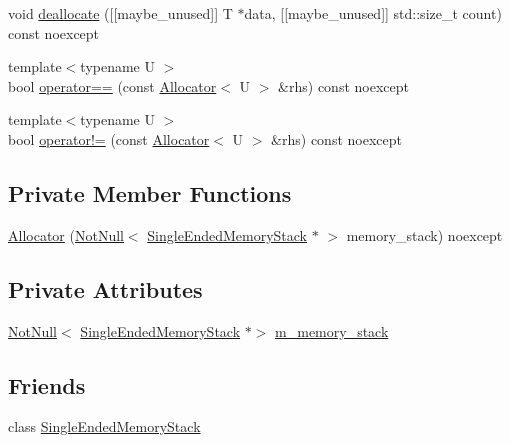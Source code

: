 \begin{DoxyCompactItemize}
void \mbox{\hyperlink{classmage_1_1_single_ended_memory_stack_1_1_allocator_ab0b13d5093410debc207d9aa7066b67c}{deallocate}} (\mbox{[}\mbox{[}maybe\+\_\+unused\mbox{]}\mbox{]} T $\ast$data, \mbox{[}\mbox{[}maybe\+\_\+unused\mbox{]}\mbox{]} std\+::size\+\_\+t count) const noexcept
\item 
{\footnotesize template$<$typename U $>$ }\\bool \mbox{\hyperlink{classmage_1_1_single_ended_memory_stack_1_1_allocator_ac59d13195925c0b0bf536edd501708b8}{operator==}} (const \mbox{\hyperlink{classmage_1_1_single_ended_memory_stack_1_1_allocator}{Allocator}}$<$ U $>$ \&rhs) const noexcept
\item 
{\footnotesize template$<$typename U $>$ }\\bool \mbox{\hyperlink{classmage_1_1_single_ended_memory_stack_1_1_allocator_a57c563e2632a28328df5588559047df6}{operator!=}} (const \mbox{\hyperlink{classmage_1_1_single_ended_memory_stack_1_1_allocator}{Allocator}}$<$ U $>$ \&rhs) const noexcept
\end{DoxyCompactItemize}
\subsection*{Private Member Functions}
\begin{DoxyCompactItemize}
\item 
\mbox{\hyperlink{classmage_1_1_single_ended_memory_stack_1_1_allocator_a8c82486b5fa67f596738805aa73559d9}{Allocator}} (\mbox{\hyperlink{namespacemage_a8769f9d670d6b585ea306cb1062af94b}{Not\+Null}}$<$ \mbox{\hyperlink{classmage_1_1_single_ended_memory_stack}{Single\+Ended\+Memory\+Stack}} $\ast$ $>$ memory\+\_\+stack) noexcept
\end{DoxyCompactItemize}
\subsection*{Private Attributes}
\begin{DoxyCompactItemize}
\item 
\mbox{\hyperlink{namespacemage_a8769f9d670d6b585ea306cb1062af94b}{Not\+Null}}$<$ \mbox{\hyperlink{classmage_1_1_single_ended_memory_stack}{Single\+Ended\+Memory\+Stack}} $\ast$$>$ \mbox{\hyperlink{classmage_1_1_single_ended_memory_stack_1_1_allocator_a8728466cdbe936716f4326f298a6f186}{m\+\_\+memory\+\_\+stack}}
\end{DoxyCompactItemize}
\subsection*{Friends}
\begin{DoxyCompactItemize}
\item 
class \mbox{\hyperlink{classmage_1_1_single_ended_memory_stack_1_1_allocator_a3f3449e5c2caa1666a293b36db6f5a54}{Single\+Ended\+Memory\+Stack}}
\end{DoxyCompactItemize}


